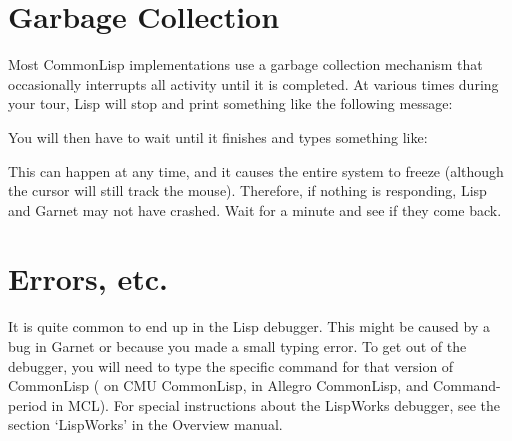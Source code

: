 \section{Garbage Collection}

Most CommonLisp implementations use a garbage collection
mechanism that occasionally interrupts
all activity until it is completed.  At various
times during your tour, Lisp will
stop and print something like the following message:
\begin{programexample}
\end{programexample}
You will then have to wait until it finishes and types something like:
\begin{programexample}
\end{programexample}
This can happen at any time, and it causes the entire system to freeze
(although the cursor will still track the mouse).  Therefore, if
nothing is responding, Lisp and Garnet may not have crashed.  Wait for
a minute and see if they come back.

\section{Errors, etc.}
It is quite common to end up in the Lisp debugger.  This might be caused by
a bug in Garnet or because you made a small typing error.  To get out of
the debugger, you will need to type the specific command for that version
of CommonLisp ( on CMU CommonLisp,  in Allegro
CommonLisp, and Command-period in MCL).  For special instructions
about the LispWorks debugger, see the section `LispWorks' in the
Overview manual.

